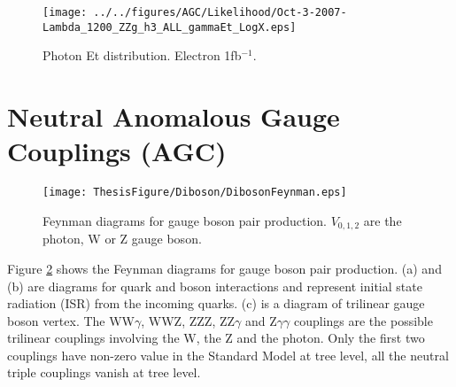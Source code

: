 \documentclass[12pt,twoside,letterpaper]{article}
\begin{document}

   \begin{figure}[!htbp]
   \begin{center}
       \texttt{[image: ../../figures/AGC/Likelihood/Oct-3-2007-Lambda\_1200\_ZZg\_h3\_ALL\_gammaEt\_LogX.eps]}
       \caption{ Photon Et distribution.  Electron 1fb$^{-1}$.}  
       \label{Fig:ISREt}
   \end{center}    
   \end{figure}


\section{Neutral Anomalous Gauge Couplings (AGC)}\label{nTGCPar}

   \begin{figure}[!htbp]
\begin{center}
       \texttt{[image: ThesisFigure/Diboson/DibosonFeynman.eps]}
       \caption{Feynman diagrams for gauge boson pair production.
       $V_{0, 1, 2}$ are the photon, W or Z gauge boson\cite{D0TGC}.}
       \label{Fig:Diboson}
\end{center}
   \end{figure}

Figure \ref{Fig:Diboson} shows the Feynman diagrams for gauge boson pair production. (a) and (b) are diagrams for quark and boson interactions and represent initial state radiation (ISR) from the incoming quarks. (c) is a diagram of trilinear gauge boson vertex. 
The WW$\gamma$, WWZ, ZZZ, ZZ$\gamma$ and Z$\gamma\gamma$ couplings are
the possible trilinear couplings involving the W, the Z and the photon. 
Only the first two couplings have
non-zero value in the Standard Model at tree level, all the neutral
triple couplings vanish at tree level.  
\end{document}
